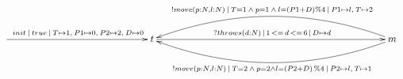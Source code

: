 $\xymatrix{
   \ar[rrrrr]^{init\:|\:true\:|\:T\mapsto 1,\:P1\mapsto 0,\:P2\mapsto 2,\:D\mapsto 0} &&&&& {t} \ar[rrrrrrrr]^{?throws(d:N)\,|\,1\,<=\,d\,<=\,6\,|\,D\mapsto d} &&&&&&&& {m} \ar@/_2pc/[llllllll]_{!move(p:N,l:N)\: |\: T=1 \:\land\: p=1 \:\land\: l = (P1+D)\%4\:|\:P1\mapsto l,\:T\mapsto 2} \ar@/^2pc/[llllllll]^{!move(p:N,l:N) \:|\: T=2 \:\land\: p=2 \land l = (P2+D)\,\%4\:|\: P2\mapsto l,\:T\mapsto 1}
}$
